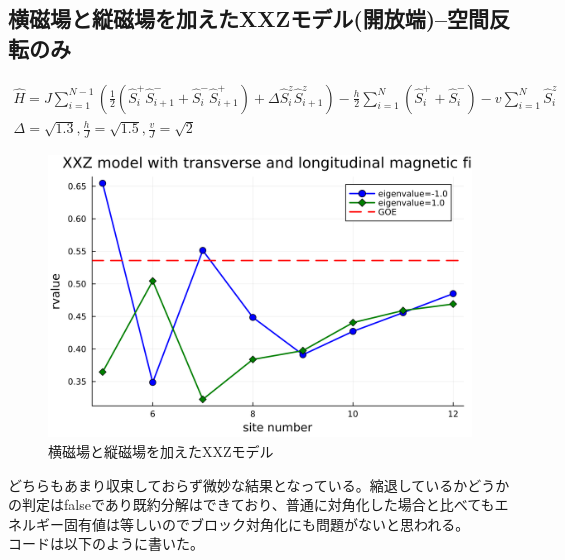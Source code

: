 \documentclass{ltjsarticle}
\begin{document}
\subsection*{横磁場と縦磁場を加えたXXZモデル(開放端)--空間反転のみ}
\begin{gather}
  \hat{H}=J\sum_{i=1}^{N-1} \left(\frac{1}{2}(\hat{S}_i^+\hat{S}_{i+1}^- + \hat{S}_i^-\hat{S}_{i+1}^+) + \Delta\hat{S}_i^z\hat{S}_{i+1}^z\right)  - \frac{h}{2}\sum_{i=1}^{N} \left( \hat{S}_i^+ + \hat{S}_i^- \right) - v\sum_{i=1}^{N} \hat{S}_i^z\\
  \Delta=\sqrt{1.3},\frac{h}{J}=\sqrt{1.5},\frac{v}{J}=\sqrt{2}
\end{gather}
\begin{figure}[H]
  \centering
  \includegraphics[width=150mm]{rvalue_xxz.png}
  \caption{横磁場と縦磁場を加えたXXZモデル}
  \label{fig:rvalue_xxz}
\end{figure}
どちらもあまり収束しておらず微妙な結果となっている。縮退しているかどうかの判定はfalseであり既約分解はできており、普通に対角化した場合と比べてもエネルギー固有値は等しいのでブロック対角化にも問題がないと思われる。\\
コードは以下のように書いた。
\end{document}
